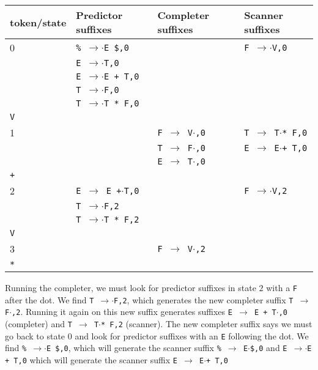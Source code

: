 \documentclass[11pt]{article}
\def\ra{\rightarrow}
\begin{document}
\begin{tabular}{|l|l|l|l|}
\hline
token/state & Predictor suffixes & Completer suffixes & Scanner suffixes\\
\hline
0     & \texttt{\% $\ra$$\cdot$E \$,0} & & \texttt{F $\ra$$\cdot$V,0}\\
      & \texttt{E $\ra$$\cdot$T,0} & & \\
      & \texttt{E $\ra$$\cdot$E + T,0} & & \\
      & \texttt{T $\ra$$\cdot$F,0} & & \\
      & \texttt{T $\ra$$\cdot$T * F,0} & & \\
\hline
\texttt{V} &  & &\\
\hline
1     &  & \texttt{F $\ra$ V$\cdot$,0}& \texttt{T $\ra$ T$\cdot$* F,0} \\
      &  & \texttt{T $\ra$ F$\cdot$,0}& \texttt{E $\ra$ E$\cdot$+ T,0} \\
      &  & \texttt{E $\ra$ T$\cdot$,0}& \\
\hline
\texttt{+} &  & &\\
\hline
2     & \texttt{E $\ra$ E +$\cdot$T,0} & & \texttt{F $\ra$$\cdot$V,2}\\
      & \texttt{T $\ra$$\cdot$F,2} & & \\
      & \texttt{T $\ra$$\cdot$T * F,2} & & \\
\hline 
\texttt{V} & & &\\
\hline
3     &  &  \texttt{F $\ra$ V$\cdot$,2}& \\
\hline
\texttt{*} & & & \\
\hline
\end{tabular}

Running the completer, we must look for predictor suffixes in state $2$
with a \texttt{F} after the dot.  We find \texttt{T $\ra$$\cdot$F,2},
which generates the new completer suffix \texttt{T $\ra$ F$\cdot$,2}.
Running it again on this new suffix generates suffixes \texttt{E $\ra$
E + T$\cdot$,0} (completer) and \texttt{T $\ra$ T$\cdot$* F,2}
(scanner).  The new completer suffix says we must go back to state $0$
and look for predictor suffixes with an \texttt{E} following the dot.
We find \texttt{\% $\ra$$\cdot$E \$,0}, which will generate the
scanner suffix \texttt{\% $\ra$ E$\cdot$\$,0} and \texttt{E
  $\ra$$\cdot$E + T,0} which will generate the scanner suffix 
\texttt{E $\ra$ E$\cdot$+ T,0}
\end{document}
